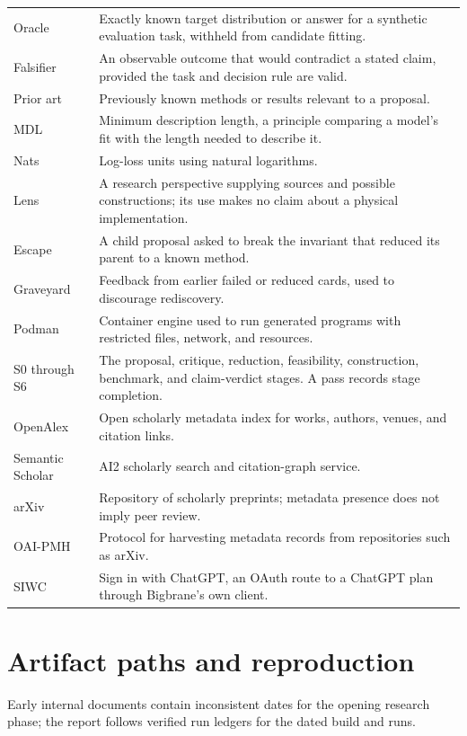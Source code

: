 \begin{longtable}{p{3.3cm}p{10.8cm}}
Oracle & Exactly known target distribution or answer for a synthetic evaluation task, withheld from candidate fitting. \\
Falsifier & An observable outcome that would contradict a stated claim, provided the task and decision rule are valid. \\
Prior art & Previously known methods or results relevant to a proposal. \\
MDL & Minimum description length, a principle comparing a model's fit with the length needed to describe it. \\
Nats & Log-loss units using natural logarithms. \\
Lens & A research perspective supplying sources and possible constructions; its use makes no claim about a physical implementation. \\
Escape & A child proposal asked to break the invariant that reduced its parent to a known method. \\
Graveyard & Feedback from earlier failed or reduced cards, used to discourage rediscovery. \\
Podman & Container engine used to run generated programs with restricted files, network, and resources. \\
S0 through S6 & The proposal, critique, reduction, feasibility, construction, benchmark, and claim-verdict stages. A pass records stage completion. \\
OpenAlex & Open scholarly metadata index for works, authors, venues, and citation links. \\
Semantic Scholar & AI2 scholarly search and citation-graph service. \\
arXiv & Repository of scholarly preprints; metadata presence does not imply peer review. \\
OAI-PMH & Protocol for harvesting metadata records from repositories such as arXiv. \\
SIWC & Sign in with ChatGPT, an OAuth route to a ChatGPT plan through Bigbrane's own client. \\
\bottomrule
\end{longtable}

\section{Artifact paths and reproduction}

Early internal documents contain inconsistent dates for the opening research phase; the report follows verified run ledgers for the dated build and runs.


